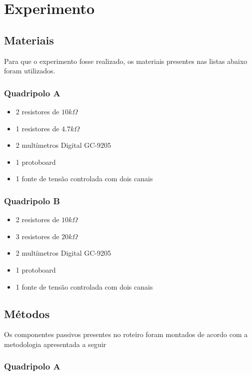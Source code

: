 \section{Experimento}\label{ref:experimentos}

\subsection{Materiais} 

Para que o experimento fosse realizado, os materiais presentes nas listas abaixo foram utilizados.

\subsubsection{Quadripolo A}

\begin{itemize}
	\item 2 resistores de $10k\Omega$
	\item 1 resistores de $4.7k\Omega$
	\item 2 multímetros Digital GC-9205
	\item 1 protoboard
	\item 1 fonte de tensão controlada com dois canais
\end{itemize}

\subsubsection{Quadripolo B}

\begin{itemize}
	\item 2 resistores de $10k\Omega$ 
	\item 3 resistores de $20k\Omega$ 
	\item 2 multímetros Digital GC-9205
	\item 1 protoboard
	\item 1 fonte de tensão controlada com dois canais
\end{itemize}

\subsection{Métodos}

Os componentes passivos presentes no roteiro foram montados de acordo com a metodologia apresentada a seguir

\subsubsection{Quadripolo A}


